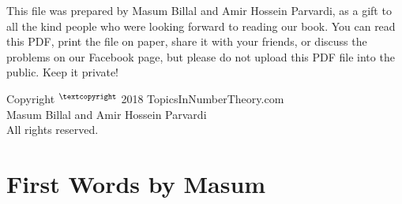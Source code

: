 \documentclass[leqno, 12pt]{book}
\begin{document}
This file was prepared by Masum Billal and Amir Hossein Parvardi, as a gift to all the kind people who were looking forward to reading our book. You can read this PDF, print the file on paper, share it with your friends, or discuss the problems on our Facebook page, but please do not upload this PDF file into the public. Keep it private! 
\vspace{0.3cm}
\begin{center}
Copyright $^{\tiny{\textcopyright}}$ 2018 TopicsInNumberTheory.com\\
Masum Billal and Amir Hossein Parvardi\\
All rights reserved.


\end{center}

\newpage
\section*{First Words by Masum}
%	
\end{document}
